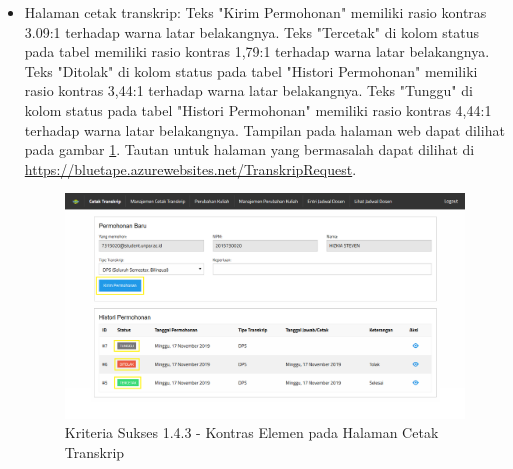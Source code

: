 \documentclass[a4paper,twoside]{article}
\begin{document}
\begin{enumerate}
\begin{itemize}
			\item Halaman cetak transkrip: Teks "Kirim Permohonan" memiliki rasio kontras 3.09:1 terhadap warna latar belakangnya. Teks "Tercetak" di kolom status pada tabel memiliki rasio kontras 1,79:1 terhadap warna latar belakangnya. Teks "Ditolak" di kolom status pada tabel "Histori Permohonan" memiliki rasio kontras 3,44:1 terhadap warna latar belakangnya. Teks "Tunggu" di kolom status pada tabel "Histori Permohonan" memiliki rasio kontras 4,44:1 terhadap warna latar belakangnya. Tampilan pada halaman web dapat dilihat pada gambar \ref{fig:1.4.3_contrast_minimum_2}. Tautan untuk halaman yang bermasalah dapat dilihat di \url{https://bluetape.azurewebsites.net/TranskripRequest}.
			\begin{figure}[H]
				\centering  
				\includegraphics[scale=0.3, frame]{kriteria-sukses-1-4-3-contrast-minimum-2}  
				\caption[Kriteria Sukses 1.4.3 - Kontras Elemen pada Halaman Cetak Transkrip]{Kriteria Sukses 1.4.3 - Kontras Elemen pada Halaman Cetak Transkrip}
				\label{fig:1.4.3_contrast_minimum_2}  
			\end{figure} 
			

\end{itemize}
\end{enumerate}
\end{document}
